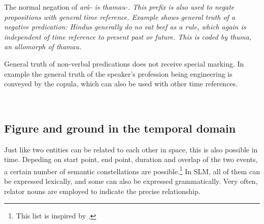 %
%
%
%
%
%
The normal negation of \em arà- \em is \em thamau-\em. This prefix is also used to negate propositions with general time reference. Example  shows general truth of a negative predication: Hindus generally do no eat beef as a rule, which again is independent of time reference to present past or future.  This is coded by \em thuma\em, an allomorph of \em thamau\em.



General truth of non-verbal predications does not receive special marking. In example  the general truth of the speaker's profession being engineering is conveyed by the copula, which can also be used with other time references.


 \\
\subsection{Figure and ground in the temporal domain}\label{sec:func:Figureandgroundinthetemporaldomain}
Just like two entities can be related to each other in space, this is also possible in time. Depeding on start point, end point, duration and overlap of the two events, a certain number of semantic constellations are possible.\footnote{This list is inspired by \citep[330]{Givon2001}.}  In SLM, all of them can be expressed lexically, and some can also be expressed grammatically. Very often, relator nouns are employed to indicate the precise relationship.

